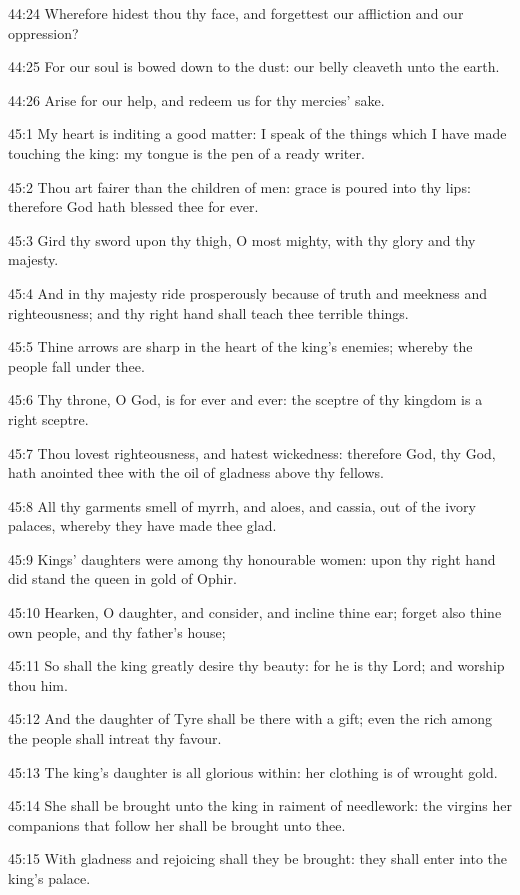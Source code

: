 44:24 Wherefore hidest thou thy face, and forgettest our affliction
and our oppression?

44:25 For our soul is bowed down to the dust: our belly cleaveth unto
the earth.

44:26 Arise for our help, and redeem us for thy mercies' sake.



45:1 My heart is inditing a good matter: I speak of the things which I
have made touching the king: my tongue is the pen of a ready writer.

45:2 Thou art fairer than the children of men: grace is poured into
thy lips: therefore God hath blessed thee for ever.

45:3 Gird thy sword upon thy thigh, O most mighty, with thy glory and
thy majesty.

45:4 And in thy majesty ride prosperously because of truth and
meekness and righteousness; and thy right hand shall teach thee
terrible things.

45:5 Thine arrows are sharp in the heart of the king's enemies;
whereby the people fall under thee.

45:6 Thy throne, O God, is for ever and ever: the sceptre of thy
kingdom is a right sceptre.

45:7 Thou lovest righteousness, and hatest wickedness: therefore God,
thy God, hath anointed thee with the oil of gladness above thy
fellows.

45:8 All thy garments smell of myrrh, and aloes, and cassia, out of
the ivory palaces, whereby they have made thee glad.

45:9 Kings' daughters were among thy honourable women: upon thy right
hand did stand the queen in gold of Ophir.

45:10 Hearken, O daughter, and consider, and incline thine ear; forget
also thine own people, and thy father's house;

45:11 So shall the king greatly desire thy beauty: for he is thy Lord;
and worship thou him.

45:12 And the daughter of Tyre shall be there with a gift; even the
rich among the people shall intreat thy favour.

45:13 The king's daughter is all glorious within: her clothing is of
wrought gold.

45:14 She shall be brought unto the king in raiment of needlework: the
virgins her companions that follow her shall be brought unto thee.

45:15 With gladness and rejoicing shall they be brought: they shall
enter into the king's palace.

